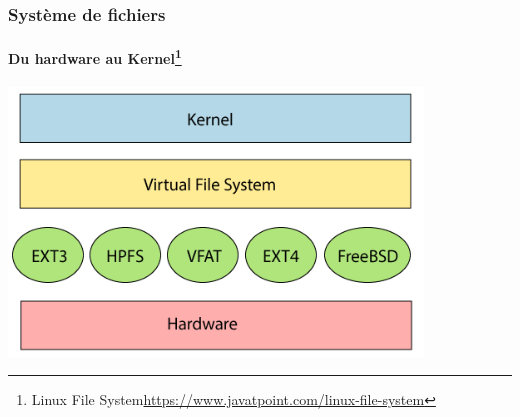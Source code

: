 \documentclass{beamer}
\begin{document}
    \begin{frame}
        \transdissolve
        \frametitle{Système de fichiers}
        \framesubtitle{Du hardware au Kernel\footnote{Linux File System\url{https://www.javatpoint.com/linux-file-system}}}
        \centering
        \includegraphics[width=11cm]{image/linux-file-system-stack}
    \end{frame}
\end{document}
